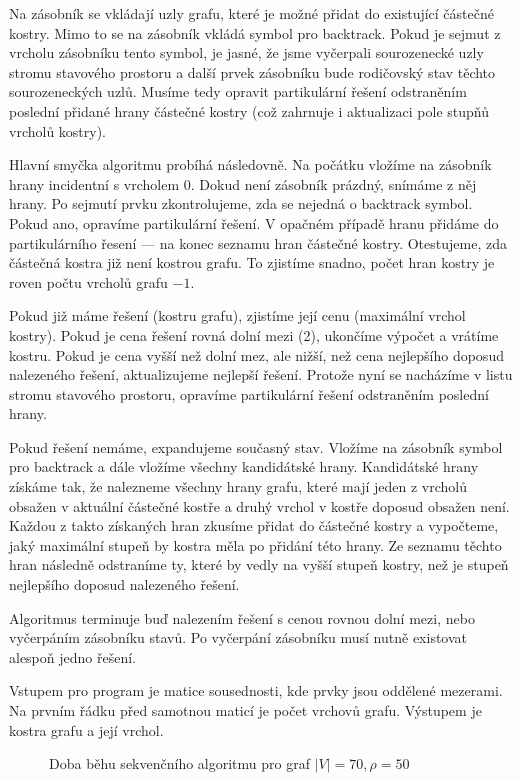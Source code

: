 \documentclass[12pt]{article}
\begin{document}
Na zásobník se vkládají uzly grafu, které je možné přidat do existující částečné kostry. Mimo to se na zásobník vkládá symbol pro backtrack. Pokud je sejmut z vrcholu zásobníku tento symbol, je jasné, že jsme vyčerpali sourozenecké uzly stromu stavového prostoru a další prvek zásobníku bude rodičovský stav těchto sourozeneckých uzlů. Musíme tedy opravit partikulární řešení odstraněním poslední přidané hrany částečné kostry (což zahrnuje i aktualizaci pole stupňů vrcholů kostry).

Hlavní smyčka algoritmu probíhá následovně. Na počátku vložíme na zásobník hrany incidentní s vrcholem 0. Dokud není zásobník prázdný, snímáme z něj hrany. Po sejmutí prvku zkontrolujeme, zda se nejedná o backtrack symbol. Pokud ano, opravíme partikulární řešení. V opačném případě hranu přidáme do partikulárního řesení --- na konec seznamu hran částečné kostry. Otestujeme, zda částečná kostra již není kostrou grafu. To zjistíme snadno, počet hran kostry je roven počtu vrcholů grafu $-1$.

Pokud již máme řešení (kostru grafu), zjistíme její cenu (maximální vrchol kostry). Pokud je cena řešení rovná dolní mezi (2), ukončíme výpočet a vrátíme kostru. Pokud je cena vyšší než dolní mez, ale nižší, než cena nejlepšího doposud nalezeného řešení, aktualizujeme nejlepší řešení. Protože nyní se nacházíme v listu stromu stavového prostoru, opravíme partikulární řešení odstraněním poslední hrany.

Pokud řešení nemáme, expandujeme současný stav. Vložíme na zásobník symbol pro backtrack a dále vložíme všechny kandidátské hrany. Kandidátské hrany získáme tak, že nalezneme všechny hrany grafu, které mají jeden z vrcholů obsažen v aktuální částečné kostře a druhý vrchol v kostře doposud obsažen není. Každou z takto získaných hran zkusíme přidat do částečné kostry a vypočteme, jaký maximální stupeň by kostra měla po přidání této hrany. Ze seznamu těchto hran následně odstraníme ty, které by vedly na vyšší stupeň kostry, než je stupeň nejlepšího doposud nalezeného řešení.

Algoritmus terminuje buď nalezením řešení s cenou rovnou dolní mezi, nebo vyčerpáním zásobníku stavů. Po vyčerpání zásobníku musí nutně existovat alespoň jedno řešení.

Vstupem pro program je matice sousednosti, kde prvky jsou oddělené mezerami. Na prvním řádku před samotnou maticí je počet vrchovů grafu. Výstupem je kostra grafu a její vrchol.

\begin{figure}[ht]
\epsfysize=9cm \centerline{} \caption{Doba běhu sekvenčního algoritmu pro graf $\vert V \vert = 70, \rho = 50$} \label{seq}
\end{figure}
\end{document}

